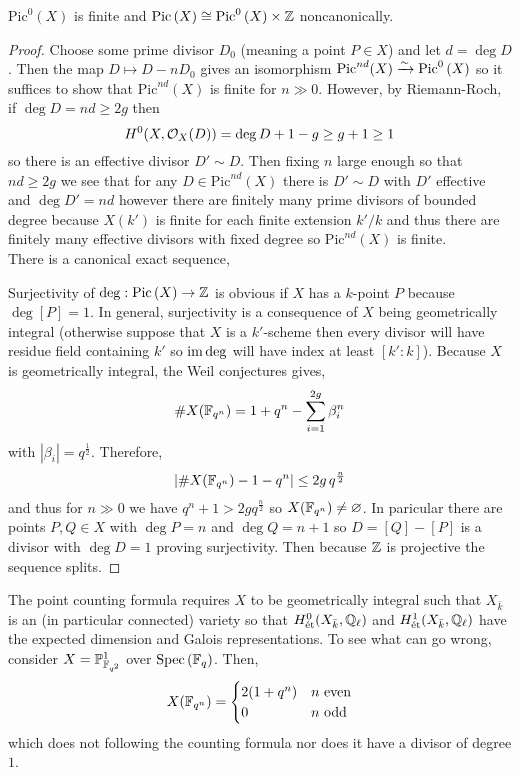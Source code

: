 \documentclass[12pt]{article}
\begin{document}
\newcommand{\Picz}[1]{\mathrm{Pic}^0\left( #1 \right)}

\begin{lemma}
$\Picz{X}$ is finite and $\Pic{X} \cong \Picz{X} \times \Z$ noncanonically.
\end{lemma}

\begin{proof}
Choose some prime divisor $D_0$ (meaning a point $P \in X$) and let $d = \deg{D}$. Then the map $D \mapsto D - nD_0$ gives an isomorphism $\mathrm{Pic}^{nd}(X) \iso \Picz{X}$ so it suffices to show that $\mathrm{Pic}^{nd}(X)$ is finite for $n \gg 0$. However, by Riemann-Roch, if $\deg{D} = nd \ge 2g$ then 
\[ H^0(X, \mathcal{O}_{X}(D)) = \deg{D} + 1 - g \ge g + 1 \ge 1 \]
so there is an effective divisor $D' \sim D$. Then fixing $n$ large enough so that $nd \ge 2g$ we see that for any $D \in \mathrm{Pic}^{nd}(X)$ there is $D' \sim D$ with $D'$ effective and $\deg{D'} = nd$ however there are finitely many prime divisors of bounded degree because $X(k')$ is finite for each finite extension $k'/k$ and thus there are finitely many effective divisors with fixed degree so $\mathrm{Pic}^{nd}(X)$ is finite.
\bigskip\\
There is a canonical exact sequence,
\begin{center}
\end{center}
Surjectivity of $\deg : \mathrm{Pic} \left( X \right) \to \mathbb{Z}$ is obvious if $X$ has a $k$-point $P$ because $\deg{[P]} = 1$. In general, surjectivity is a consequence of $X$ being geometrically integral (otherwise suppose that $X$ is a $k'$-scheme then every divisor will have residue field containing $k'$ so $\operatorname{\mathrm{im}}{\deg}$ will have index at least $[k' : k]$). Because $X$ is geometrically integral, the Weil conjectures gives,
\[ \# X(\mathbb{F}_{q^n}) = 1 + q^n - \sum_{i = 1}^{2g} \beta_i^n \]
with $|\beta_i| = q^{\frac{1}{2}}$. Therefore,
\[ | \# X(\mathbb{F}_{q^n}) - 1 - q^n | \le 2 g \, q^{\frac{n}{2}} \]
and thus for $n \gg 0$ we have $q^n +1 > 2g q^{\frac{n}{2}}$ so $X(\mathbb{F}_{q^n}) \neq \varnothing$. In paricular there are points $P, Q \in X$ with $\deg{P} = n$ and $\deg{Q} = n+1$ so $D = [Q] - [P]$ is a divisor with $\deg{D} = 1$ proving surjectivity. Then because $\mathbb{Z}$ is projective the sequence splits.
\end{proof}

\begin{rmk}
The point counting formula requires $X$ to be geometrically integral such that $X_{\bar{k}}$ is an (in particular connected) variety so that $H^0_{\text{\'{e}t}}(X_{\bar{k}}, \mathbb{Q}_\ell)$ and $H^1_{\text{\'{e}t}}(X_{\bar{k}}, \mathbb{Q}_\ell)$ have the expected dimension and Galois representations. To see what can go wrong, consider $X = \mathbb{P}^1_{\mathbb{F}_{q^2}}$ over $\mathrm{Spec}\left( \mathbb{F}_q \right)$. Then,
\[ X(\mathbb{F}_{q^n}) = 
\begin{cases}
2(1 + q^n) & n \text{ even}
\\
0 & n \text{ odd}
\end{cases} \]
which does not following the counting formula nor does it have a divisor of degree $1$.
\end{rmk}
\end{document}
